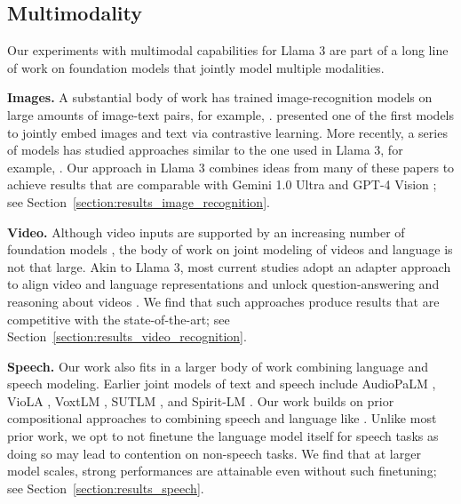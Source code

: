 \documentclass[dvipsnames]{fairmeta}
\begin{document}
\subsection{Multimodality}
\label{section:related_work_multimodality}
Our experiments with multimodal capabilities for Llama 3 are part of a long line of work on foundation models that jointly model multiple modalities.

\textbf{Images.} 
A substantial body of work has trained image-recognition models on large amounts of image-text pairs, for example, \citet{Mahajan_2018_ECCV,xiao2024florence,chameleon2024,openai2023gpt4blog}.
\citet{radford2021learning} presented one of the first models to jointly embed images and text via contrastive learning. 
More recently, a series of models has studied approaches similar to the one used in Llama 3, for example, \citet{alayrac2022flamingo,dai2023instructblip,liu2023llava,liu2023improvedllava,yang2023mmreact,ye2023mplug,zhu2023minigpt}.
Our approach in Llama 3 combines ideas from many of these papers to achieve results that are comparable with Gemini 1.0 Ultra \citep{gemini2023gemini} and GPT-4 Vision \citep{openai2023gpt4blog}; see Section~\ref{section:results_image_recognition}.

\textbf{Video.}
Although video inputs are supported by an increasing number of foundation models \citep{gemini2023gemini,openai2023gpt4blog}, the body of work on joint modeling of videos and language is not that large.
Akin to Llama 3, most current studies adopt an adapter approach to align video and language representations and unlock question-answering and reasoning about videos \citep{lin2023video,li2023videochat,Maaz2023VideoChatGPT,zhang2023videollama,zhao2022lavila}.
We find that such approaches produce results that are competitive with the state-of-the-art; see Section~\ref{section:results_video_recognition}.

\textbf{Speech.}
Our work also fits in a larger body of work combining language and speech modeling.
Earlier joint models of text and speech include AudioPaLM \citep{rubenstein2023audiopalm}, VioLA \citep{wang2023viola}, VoxtLM \cite{maiti2023voxtlm}, SUTLM \citep{chou2023sutlm}, and Spirit-LM \citep{nguyen2024spirit}.
Our work builds on prior compositional approaches to combining speech and language like \citet{fathullah2024audiochatllama}.
Unlike most prior work, we opt to not finetune the language model itself for speech tasks as doing so may lead to contention on non-speech tasks.
We find that at larger model scales, strong performances are attainable even without such finetuning; see Section~\ref{section:results_speech}.
\end{document}
